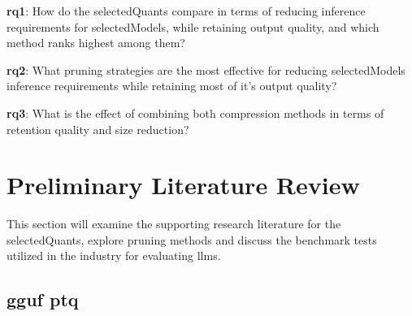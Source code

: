 \documentclass{ifacconf}
\begin{document}
	\textbf{\gls{rq}1}: How do the \gls{selectedQuants} compare in terms of reducing inference requirements for \gls{selectedModels}, while retaining output quality, and which method ranks highest among them?
	
	\textbf{\gls{rq}2}: What pruning strategies are the most effective for reducing \gls{selectedModels} inference requirements while retaining most of it's output quality?
	
	\textbf{\gls{rq}3}: What is the effect of combining both compression methods in terms of retention quality and size reduction?
	
	
	\section{Preliminary Literature Review}
	This section will examine the supporting research literature for the \gls{selectedQuants}, explore pruning methods and discuss the benchmark tests utilized in the industry for evaluating \glspl{llm}.
	
	\subsection{\gls{gguf} \gls{ptq}}
	
\end{document}
